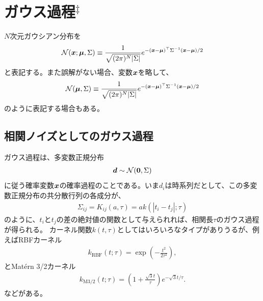 \section{ガウス過程$^\ddagger$}

$N$次元ガウシアン分布を
\begin{align}
    \mathcal{N}(\boldsymbol{x};\boldsymbol{\mu}, \Sigma) \equiv \dfrac{1}{\sqrt{(2 \pi)^{N} |\Sigma|}} e^{- (\boldsymbol{x} - \boldsymbol{\mu})^\top \Sigma^{-1}(\boldsymbol{x} - \boldsymbol{\mu}) /2  }
\end{align}
と表記する。また誤解がない場合、変数$\boldsymbol{x}$を略して、
\begin{align}
    \mathcal{N}(\boldsymbol{\mu}, \Sigma) \equiv \dfrac{1}{\sqrt{(2 \pi)^{N} |\Sigma|}} e^{- (\boldsymbol{x} - \boldsymbol{\mu})^\top \Sigma^{-1}(\boldsymbol{x} - \boldsymbol{\mu}) /2  }
\end{align}
のように表記する場合もある。

\subsection*{相関ノイズとしてのガウス過程}
ガウス過程は、多変数正規分布
\begin{align}
\boldsymbol{d} \sim \mathcal{N}(\boldsymbol{0},\Sigma)
\end{align}
に従う確率変数$\boldsymbol{x}$の確率過程のことである。いま$d_i$は時系列だとして、この多変数正規分布の共分散行列の各成分が、
\begin{align}
\Sigma_{ij} = K_{ij}(a, \tau) = a k(|t_i-t_j|; \tau)
\end{align}
のように、$t_i$と$t_j$の差の絶対値の関数として与えられれば、相関長$\tau$のガウス過程が得られる。
カーネル関数$k(t,\tau)$としてはいろいろなタイプがありうるが、例えばRBFカーネル
\begin{align}
 k_\mathrm{RBF}(t;\tau) = \exp{\left(- \frac{t^2}{2 \tau^2} \right)},
\end{align}
とMat\'{e}rn 3/2カーネル
\begin{align}
\label{eq:MaternA}
 k_\mathrm{M3/2}(t;\tau) = \left( 1 + \frac{\sqrt{3} t}{\tau} \right) e^{- \sqrt{3} t/\tau}. 
\end{align}
などがある。

